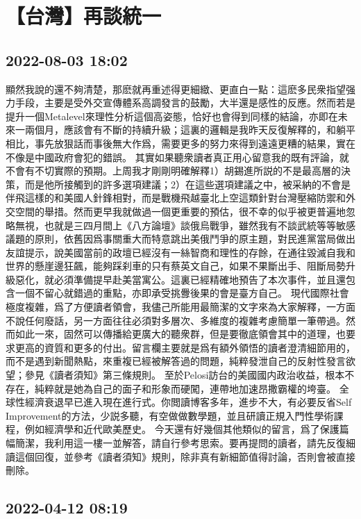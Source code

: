 \documentclass[twocolumn]{ctexart}
\begin{document}
\section*{【台灣】再談統一}
\subsection*{2022-08-03 18:02}

顯然我說的還不夠清楚，那麽就再重述得更細緻、更直白一點：這麽多民衆指望强力手段，主要是受外交宣傳體系高調發言的鼓勵，大半還是感性的反應。然而若是提升一個Metalevel來理性分析這個高姿態，恰好也會得到同樣的結論，亦即在未來一兩個月，應該會有不斷的持續升級；這裏的邏輯是我昨天反復解釋的，和躺平相比，事先放狠話而事後無大作爲，需要更多的努力來得到遠遠更糟的結果，實在不像是中國政府會犯的錯誤。
其實如果聽衆讀者真正用心留意我的既有評論，就不會有不切實際的預期。上周我才剛剛明確解釋1）胡錫進所説的不是最高層的決策，而是他所接觸到的許多選項建議；2）在這些選項建議之中，被采納的不會是伴飛這樣的和美國人針鋒相對，而是戰機飛越臺北上空這類針對台灣壓縮防禦和外交空間的舉措。然而更早我就做過一個更重要的預估，很不幸的似乎被更普遍地忽略無視，也就是三四月間上《八方論壇》談俄烏戰爭，雖然我有不談武統等等敏感議題的原則，依舊因爲事關重大而特意跳出美俄鬥爭的原主題，對民進黨當局做出友誼提示，說美國當前的政壇已經沒有一絲智商和理性的存餘，在通往毀滅自我和世界的懸崖邊狂飆，能夠踩刹車的只有蔡英文自己，如果不果斷出手、阻斷局勢升級惡化，就必須準備提早赴美當寓公。這裏已經精確地預告了本次事件，並且還包含一個不留心就錯過的重點，亦即承受挑釁後果的會是臺方自己。
現代國際社會極度複雜，爲了方便讀者領會，我儘己所能用最簡潔的文字來為大家解釋，一方面不說任何廢話，另一方面往往必須對多層次、多維度的複雜考慮簡單一筆帶過。然而如此一來，固然可以傳播給更廣大的聽衆群，但是要徹底領會其中的道理，也要求更高的資質和更多的付出。留言欄主要就是爲有額外領悟的讀者澄清細節用的，而不是遇到新聞熱點，來重複已經被解答過的問題，純粹發泄自己的反射性發言欲望；參見《讀者須知》第三條規則。
至於Pelosi訪台的美國國内政治收益，根本不存在，純粹就是她為自己的面子和形象而硬闖，連帶地加速昂撒霸權的垮臺。
全球性經濟衰退早已進入現在進行式。你閲讀博客多年，進步不大，有必要反省Self Improvement的方法，少説多聽，有空做做數學題，並且研讀正規入門性學術課程，例如經濟學和近代歐美歷史。
今天還有好幾個其他類似的留言，爲了保護篇幅簡潔，我利用這一樓一並解答，請自行參考思索。要再提問的讀者，請先反復細讀這個回復，並參考《讀者須知》規則，除非真有新細節值得討論，否則會被直接刪除。
\subsection*{2022-04-12 08:19}
\end{document}
